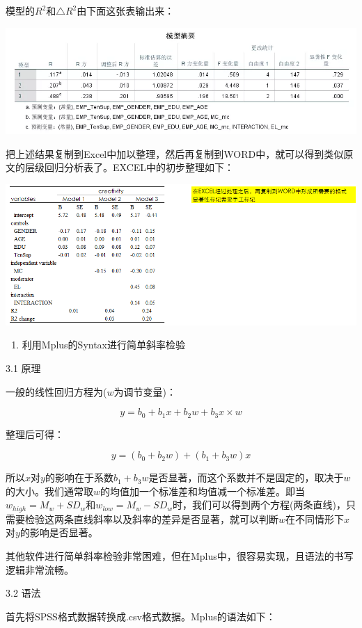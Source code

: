 \documentclass[
]{book}
\providecommand{\tightlist}{%
  \setlength{\itemsep}{0pt}\setlength{\parskip}{0pt}}
\begin{document}
模型的\(R^{2}\)和\(\triangle R^{2}\)由下面这张表输出来：

\includegraphics{figs/1319.png}

把上述结果复制到Excel中加以整理，然后再复制到WORD中，就可以得到类似原文的层级回归分析表了。EXCEL中的初步整理如下：

\includegraphics{figs/13110.png}

\begin{enumerate}
\def\labelenumi{\arabic{enumi}.}
\setcounter{enumi}{2}
\tightlist
\item
  利用Mplus的Syntax进行简单斜率检验
\end{enumerate}

3.1 原理

一般的线性回归方程为(\(w\)为调节变量)：

\[
y=b_{0}+b_{1}x+b_{2}w+b_{3}x{\times}w
\]

整理后可得：

\[
y=(b_{0}+b_{2}w)+(b_{1}+b_{3}w)x
\]

所以\(x\)对\(y\)的影响在于系数\(b_{1}+b_{3}w\)是否显著，而这个系数并不是固定的，取决于\(w\)的大小。我们通常取\(w\)的均值加一个标准差和均值减一个标准差。即当\(w_{high}=M_{w}+SD_{w}\)和\(w_{low}=M_{w}-SD_{w}\)时，我们可以得到两个方程(两条直线)，只需要检验这两条直线斜率以及斜率的差异是否显著，就可以判断\(w\)在不同情形下\(x\)对\(y\)的影响是否显著。

其他软件进行简单斜率检验非常困难，但在Mplus中，很容易实现，且语法的书写逻辑非常流畅。

3.2 语法

首先将SPSS格式数据转换成.csv格式数据。Mplus的语法如下：
\end{document}
